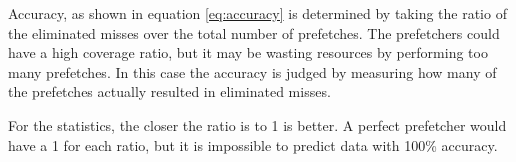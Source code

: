     Accuracy, as shown in equation \ref{eq:accuracy} is determined by taking the ratio of the eliminated misses over the total number of prefetches. The prefetchers could have a high coverage ratio, but it may be wasting resources by performing too many prefetches. In this case the accuracy is judged by measuring how many of the prefetches actually resulted in eliminated misses.
    
    

    For the statistics, the closer the ratio is to 1 is better. A perfect prefetcher would have a 1 for each ratio, but it is impossible to predict data with 100\% accuracy.